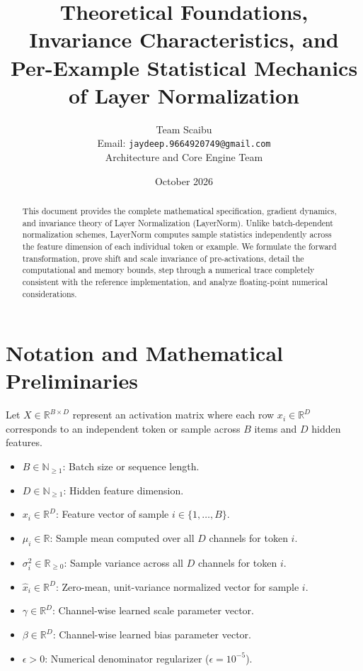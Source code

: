 \documentclass[11pt,a4paper]{article}
\title{\textbf{Theoretical Foundations, Invariance Characteristics, and Per-Example Statistical Mechanics of Layer Normalization}}
\author{Team Scaibu \\ \small Email: \texttt{jaydeep.9664920749@gmail.com} \\ \small Architecture and Core Engine Team}
\date{October 2026}
\theoremstyle{definition}
\begin{document}
\maketitle

\begin{abstract}
This document provides the complete mathematical specification, gradient dynamics, and invariance theory of Layer Normalization (LayerNorm). Unlike batch-dependent normalization schemes, LayerNorm computes sample statistics independently across the feature dimension of each individual token or example. We formulate the forward transformation, prove shift and scale invariance of pre-activations, detail the computational and memory bounds, step through a numerical trace completely consistent with the reference implementation, and analyze floating-point numerical considerations.
\end{abstract}

\section{Notation and Mathematical Preliminaries}

Let $X \in \mathbb{R}^{B \times D}$ represent an activation matrix where each row $x_i \in \mathbb{R}^D$ corresponds to an independent token or sample across $B$ items and $D$ hidden features.

\begin{itemize}
    \item $B \in \mathbb{N}_{\ge 1}$: Batch size or sequence length.
    \item $D \in \mathbb{N}_{\ge 1}$: Hidden feature dimension.
    \item $x_i \in \mathbb{R}^D$: Feature vector of sample $i \in \{1, \dots, B\}$.
    \item $\mu_i \in \mathbb{R}$: Sample mean computed over all $D$ channels for token $i$.
    \item $\sigma_i^2 \in \mathbb{R}_{\ge 0}$: Sample variance across all $D$ channels for token $i$.
    \item $\hat{x}_i \in \mathbb{R}^D$: Zero-mean, unit-variance normalized vector for sample $i$.
    \item $\gamma \in \mathbb{R}^D$: Channel-wise learned scale parameter vector.
    \item $\beta \in \mathbb{R}^D$: Channel-wise learned bias parameter vector.
    \item $\epsilon > 0$: Numerical denominator regularizer ($\epsilon = 10^{-5}$).
\end{itemize}
\end{document}
